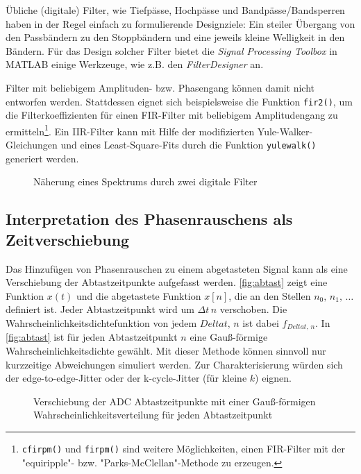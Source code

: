 Übliche (digitale) Filter, wie Tiefpässe, Hochpässe und Bandpässe/Bandsperren haben in der Regel einfach zu formulierende Designziele: Ein steiler Übergang von den Passbändern zu den Stoppbändern und eine jeweils kleine Welligkeit in den Bändern.
Für das Design solcher Filter bietet die \textit{Signal Processing Toolbox} in MATLAB einige Werkzeuge, wie z.B. den \textit{FilterDesigner} an.

Filter mit beliebigem Amplituden- bzw. Phasengang können damit nicht entworfen werden. Stattdessen eignet sich beispielsweise die Funktion \texttt{fir2()}, um die Filterkoeffizienten für einen FIR-Filter mit beliebigem Amplitudengang zu ermitteln\footnote{\texttt{cfirpm()} und \texttt{firpm()} sind weitere Möglichkeiten, einen FIR-Filter mit der "equiripple"- bzw. "Parks-McClellan"-Methode zu erzeugen.}. Ein IIR-Filter kann mit Hilfe der modifizierten Yule-Walker-Gleichungen und eines Least-Square-Fits durch die Funktion \texttt{yulewalk()} generiert werden.

\begin{figure}[H]
	\centering
	\hfill
	\caption{Näherung eines Spektrums durch zwei digitale Filter}
	\label{firIirPhasenoise}
\end{figure}

\subsection{Interpretation des Phasenrauschens als Zeitverschiebung}
Das Hinzufügen von Phasenrauschen zu einem abgetasteten Signal kann als eine Verschiebung der Abtastzeitpunkte aufgefasst werden. \autoref{fig:abtast} zeigt eine Funktion $x(t)$ und die abgetastete Funktion $x[n]$, die an den Stellen $n_0,\,n_1,\,\dots$ definiert ist. Jeder Abtastzeitpunkt wird um $\Delta t\,n$ verschoben. Die Wahrscheinlichkeitsdichtefunktion von jedem $Delta t,\,n$ ist dabei $f_{Delta t,\,n}$. In \autoref{fig:abtast} ist für jeden Abtastzeitpunkt $n$ eine Gauß-förmige Wahrscheinlichkeitsdichte gewählt. Mit dieser Methode können sinnvoll nur kurzzeitige Abweichungen simuliert werden. Zur Charakterisierung würden sich der edge-to-edge-Jitter oder der k-cycle-Jitter (für kleine $k$) eignen.

\begin{figure}[H]
	\centering
	\caption[Verschiebung der ADC Abtastzeitpunkte]{Verschiebung der ADC Abtastzeitpunkte mit einer Gauß-förmigen Wahrscheinlichkeitsverteilung für jeden Abtastzeitpunkt}
	\label{fig:abtast}
\end{figure}


